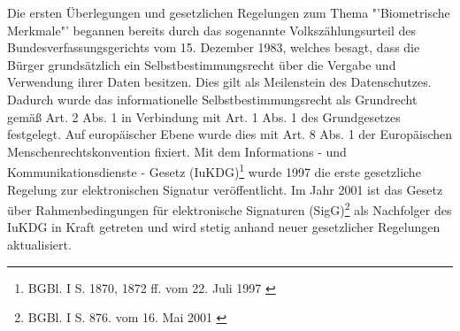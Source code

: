 Die ersten Überlegungen und gesetzlichen Regelungen zum Thema "'Biometrische Merkmale"' begannen bereits durch
das sogenannte Volkszählungsurteil des Bundesverfassungsgerichts vom 15. Dezember 1983, welches besagt, dass
die Bürger grundsätzlich ein Selbstbestimmungsrecht über die Vergabe und Verwendung ihrer Daten besitzen.
Dies gilt als Meilenstein des Datenschutzes. Dadurch wurde das informationelle Selbstbestimmungsrecht als
Grundrecht gemäß Art. 2 Abs. 1 in Verbindung mit Art. 1 Abs. 1 des Grundgesetzes festgelegt. Auf europäischer Ebene wurde dies mit Art. 8 Abs. 1 der Europäischen Menschenrechtskonvention fixiert. \cite{grundlagen1}\cite{grundlagen2}\cite{grundlagen3} Mit dem Informations - und Kommunikationsdienste - Gesetz (IuKDG)\footnote{\label{foot:2} BGBl. I S. 1870,
1872 ff. vom 22. Juli 1997 \cite{grundlagenFN1}} wurde 1997 die erste gesetzliche Regelung zur elektronischen
Signatur veröffentlicht. Im Jahr 2001 ist das Gesetz über Rahmenbedingungen für elektronische Signaturen (SigG)\footnote{\label{foot:3} BGBl. I S. 876. vom 16. Mai 2001 \cite{grundlagenFN2}} als Nachfolger des IuKDG in Kraft getreten und wird stetig anhand neuer gesetzlicher Regelungen aktualisiert. \cite{grundlagen4}